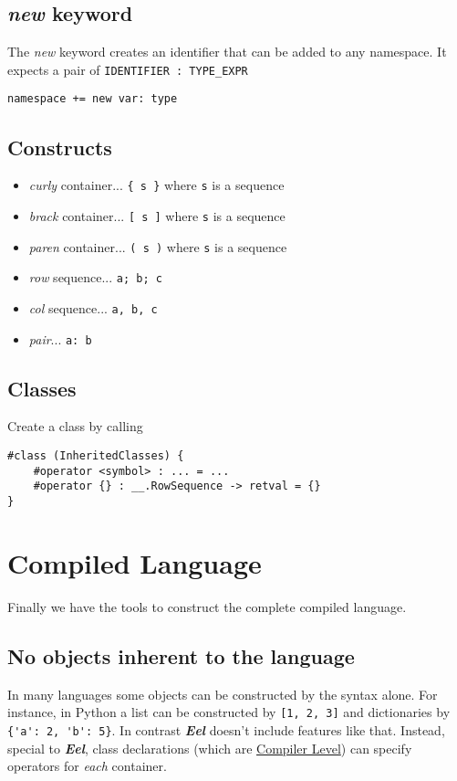 \documentclass{texclass}
\newcommand{\Eel}{\textbf{\textit{Eel}}\xspace}
\begin{document}
        \subsection{\textit{new} keyword}
        The \textit{new} keyword creates an identifier that can be added to any namespace. It expects a pair of \verb|IDENTIFIER : TYPE_EXPR|

        \verb|namespace += new var: type|

        \subsection{Constructs}
        \begin{itemize}
            \item \textit{curly} container... \verb|{ s }| where \verb|s| is a sequence
            \item \textit{brack} container... \verb|[ s ]| where \verb|s| is a sequence
            \item \textit{paren} container... \verb|( s )| where \verb|s| is a sequence
            \item \textit{row} sequence... \verb|a; b; c|
            \item \textit{col} sequence... \verb|a, b, c|
            \item \textit{pair}... \verb|a: b|
        \end{itemize}

        \subsection{Classes}
        Create a class by calling

        \begin{verbatim}
#class (InheritedClasses) {
    #operator <symbol> : ... = ...
    #operator {} : __.RowSequence -> retval = {}
}
        \end{verbatim}

    \break
    \section{Compiled Language}\label{sec:step_2}
    Finally we have the tools to construct the complete compiled language.

        \subsection{No objects inherent to the language}
        In many languages some objects can be constructed by the syntax alone. For instance, in Python a list can be constructed by \verb|[1, 2, 3]| and dictionaries by \verb|{'a': 2, 'b': 5}|. In contrast \Eel doesn't include features like that. Instead, special to \Eel, class declarations (which are \href{sec:step_1}{Compiler Level}) can specify operators for \textit{each} container.

        \subsection{}
\end{document}
